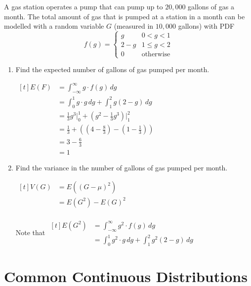 \begin{example}
    A gas station operates a pump that can pump up to $20,000$ gallons of gas a month. The total amount of gas that is pumped at a station in a month can be modelled with a random variable $G$ (measured in $10,000$ gallons) with PDF $$f(g) = \begin{cases} g & 0 < g < 1 \\ 2 - g & 1 \le g < 2 \\ 0 & \text{otherwise} \end{cases}$$

    \begin{enumerate}[label=\alph*)]
        \item Find the expected number of gallons of gas pumped per month.
        
        $\begin{aligned}[t]
            E(F) & = \int_{-\infty}^\infty g \cdot f(g) \,dg \\
            & = \int_0^1 g \cdot g \,dg + \int_1^2 g(2 - g) \,dg \\
            & = \frac{1}{3} g^3 \bigg|_0^1 + \left( g^2 - \frac{1}{3}g^3 \right) \bigg|_1^2 \\
            & = \frac{1}{3} + \left( \left( 4 - \frac{8}{3} \right) - \left( 1 - \frac{1}{3} \right) \right) \\
            & = 3 - \frac{6}{3} \\
            & = 1
        \end{aligned}$

        \item Find the variance in the number of gallons of gas pumped per month.
        
        $\begin{aligned}[t]
            V(G) & = E((G - \mu)^2) \\
                 & = E(G^2) - E(G)^2 \\
        \end{aligned}$

        Note that $\begin{aligned}[t]
            E(G^2) & = \int_{-\infty}^\infty g^2 \cdot f(g) \,dg \\
            & = \int_0^1 g^2 \cdot g \,dg + \int_1^2 g^2 (2 - g) \,dg
        \end{aligned}$
    \end{enumerate}
\end{example}

\section{Common Continuous Distributions}

